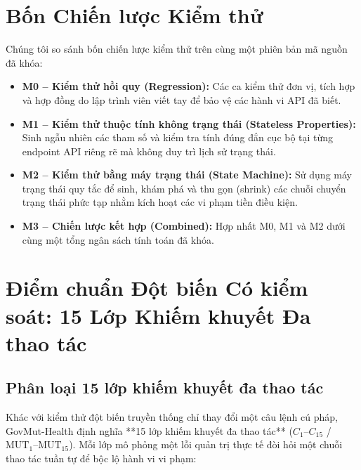 \documentclass[11pt]{article}
\begin{document}
\section{Bốn Chiến lược Kiểm thử}
Chúng tôi so sánh bốn chiến lược kiểm thử trên cùng một phiên bản mã nguồn đã khóa:
\begin{itemize}
    \item \textbf{M0 -- Kiểm thử hồi quy (Regression):} Các ca kiểm thử đơn vị, tích hợp và hợp đồng do lập trình viên viết tay để bảo vệ các hành vi API đã biết.
    \item \textbf{M1 -- Kiểm thử thuộc tính không trạng thái (Stateless Properties):} Sinh ngẫu nhiên các tham số và kiểm tra tính đúng đắn cục bộ tại từng endpoint API riêng rẽ mà không duy trì lịch sử trạng thái.
    \item \textbf{M2 -- Kiểm thử bằng máy trạng thái (State Machine):} Sử dụng máy trạng thái quy tắc để sinh, khám phá và thu gọn (shrink) các chuỗi chuyển trạng thái phức tạp nhằm kích hoạt các vi phạm tiền điều kiện.
    \item \textbf{M3 -- Chiến lược kết hợp (Combined):} Hợp nhất M0, M1 và M2 dưới cùng một tổng ngân sách tính toán đã khóa.
\end{itemize}

\section{Điểm chuẩn Đột biến Có kiểm soát: 15 Lớp Khiếm khuyết Đa thao tác}
\label{sec:benchmark}
\subsection{Phân loại 15 lớp khiếm khuyết đa thao tác}
Khác với kiểm thử đột biến truyền thống chỉ thay đổi một câu lệnh cú pháp, GovMut-Health định nghĩa **15 lớp khiếm khuyết đa thao tác** ($C_1$--$C_{15}$ / $\text{MUT}_1$--$\text{MUT}_{15}$). Mỗi lớp mô phỏng một lỗi quản trị thực tế đòi hỏi một chuỗi thao tác tuần tự để bộc lộ hành vi vi phạm:
\end{document}
